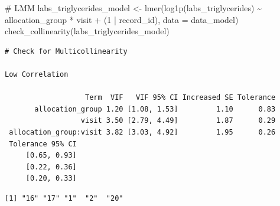 \documentclass[
  letterpaper,
  DIV=11,
  numbers=noendperiod]{scrartcl}
\newenvironment{Shaded}{\begin{snugshade}}{\end{snugshade}}
\newcommand{\AttributeTok}[1]{\textcolor[rgb]{0.40,0.45,0.13}{#1}}
\newcommand{\CommentTok}[1]{\textcolor[rgb]{0.37,0.37,0.37}{#1}}
\newcommand{\DecValTok}[1]{\textcolor[rgb]{0.68,0.00,0.00}{#1}}
\newcommand{\FunctionTok}[1]{\textcolor[rgb]{0.28,0.35,0.67}{#1}}
\newcommand{\NormalTok}[1]{\textcolor[rgb]{0.00,0.23,0.31}{#1}}
\newcommand{\OtherTok}[1]{\textcolor[rgb]{0.00,0.23,0.31}{#1}}
\newcommand{\SpecialCharTok}[1]{\textcolor[rgb]{0.37,0.37,0.37}{#1}}
\newcommand{\StringTok}[1]{\textcolor[rgb]{0.13,0.47,0.30}{#1}}
\begin{document}
\begin{Shaded}
\begin{Highlighting}[]
\CommentTok{\# LMM}
\NormalTok{labs\_triglycerides\_model }\OtherTok{\textless{}{-}} \FunctionTok{lmer}\NormalTok{(}\FunctionTok{log1p}\NormalTok{(labs\_triglycerides) }\SpecialCharTok{\textasciitilde{}}\NormalTok{ allocation\_group }\SpecialCharTok{*}\NormalTok{ visit }\SpecialCharTok{+}\NormalTok{ (}\DecValTok{1} \SpecialCharTok{|}\NormalTok{ record\_id), }\AttributeTok{data =}\NormalTok{ data\_model)}
\FunctionTok{check\_collinearity}\NormalTok{(labs\_triglycerides\_model)}
\end{Highlighting}
\end{Shaded}

\begin{verbatim}
# Check for Multicollinearity

Low Correlation

                   Term  VIF   VIF 95% CI Increased SE Tolerance
       allocation_group 1.20 [1.08, 1.53]         1.10      0.83
                  visit 3.50 [2.79, 4.49]         1.87      0.29
 allocation_group:visit 3.82 [3.03, 4.92]         1.95      0.26
 Tolerance 95% CI
     [0.65, 0.93]
     [0.22, 0.36]
     [0.20, 0.33]
\end{verbatim}

\begin{Shaded}
\end{Shaded}

\begin{verbatim}
[1] "16" "17" "1"  "2"  "20"
\end{verbatim}
\end{document}

